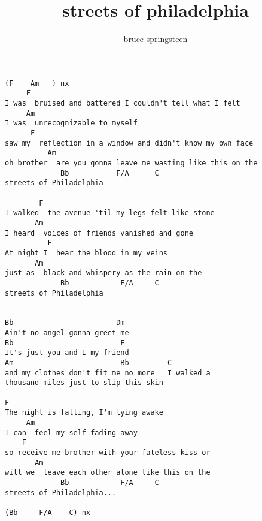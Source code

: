 \author{bruce springsteen}
\title{streets of philadelphia}
\maketitle
\begin{verbatim}
(F    Am   ) nx
     F
I was  bruised and battered I couldn't tell what I felt
     Am
I was  unrecognizable to myself
      F
saw my  reflection in a window and didn't know my own face
          Am
oh brother  are you gonna leave me wasting like this on the
             Bb           F/A      C
streets of Philadelphia

        F
I walked  the avenue 'til my legs felt like stone
       Am
I heard  voices of friends vanished and gone
          F
At night I  hear the blood in my veins
       Am
just as  black and whispery as the rain on the
             Bb            F/A     C
streets of Philadelphia


Bb                        Dm
Ain't no angel gonna greet me
Bb                         F
It's just you and I my friend
Am                         Bb         C
and my clothes don't fit me no more   I walked a
thousand miles just to slip this skin

F
The night is falling, I'm lying awake
     Am
I can  feel my self fading away
    F
so receive me brother with your fateless kiss or
       Am
will we  leave each other alone like this on the
             Bb            F/A     C
streets of Philadelphia...

(Bb     F/A    C) nx
\end{verbatim}